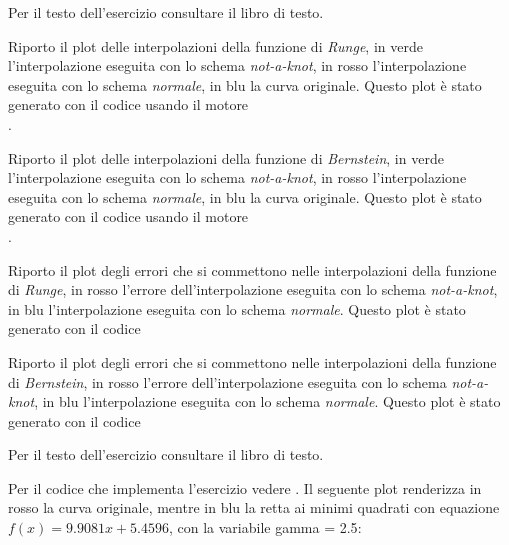 \begin{exercise}[4.19] 
Per il testo dell'esercizio consultare il libro di testo. 
\end{exercise}
Riporto il plot delle interpolazioni della funzione di \emph{Runge}, in verde
l'interpolazione eseguita con lo schema \emph{not-a-knot}, in rosso
l'interpolazione eseguita con lo schema \emph{normale}, in blu la curva
originale. Questo plot \`e stato generato con il codice
 usando il motore\\
.
\begin{center}   

\end{center}
Riporto il plot delle interpolazioni della funzione di \emph{Bernstein}, in
verde l'interpolazione eseguita con lo schema \emph{not-a-knot}, in rosso
l'interpolazione eseguita con lo schema \emph{normale}, in blu la curva
originale. Questo plot \`e stato generato con il codice
 usando il motore\\
.
\begin{center}   

\end{center}
Riporto il plot degli errori che si commettono nelle interpolazioni della
funzione di \emph{Runge}, in rosso l'errore dell'interpolazione eseguita con lo
schema \emph{not-a-knot}, in blu l'interpolazione eseguita con lo schema
\emph{normale}. Questo plot \`e stato generato con il codice
\begin{center}   

\end{center}
Riporto il plot degli errori che si commettono nelle interpolazioni della
funzione di \emph{Bernstein}, in rosso l'errore dell'interpolazione eseguita con
lo schema \emph{not-a-knot}, in blu l'interpolazione eseguita con lo schema
\emph{normale}. Questo plot \`e stato generato con il codice
\begin{center}   

\end{center}

\begin{exercise}[4.21] 
Per il testo dell'esercizio consultare il libro di testo. 
\end{exercise}
Per il codice che implementa l'esercizio vedere .
Il seguente plot renderizza in rosso la curva originale, mentre in blu la retta
ai minimi quadrati con equazione $f(x) = 9.9081x + 5.4596$, con la variabile
\textsf{gamma = 2.5}:
\begin{center}   

\end{center}

